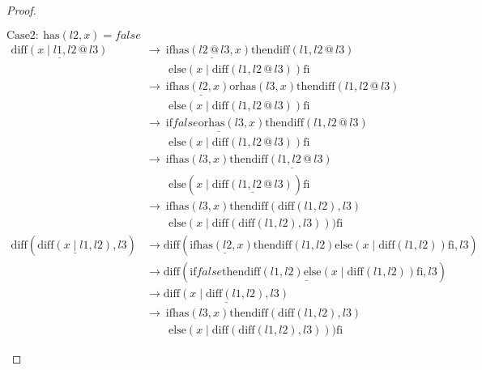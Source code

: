 \documentclass[12pt, a4paper]{article}
\newcommand{\rel}[1]{\mathrel{#1}}
\newcommand{\rmx}[1]{\mathrm{#1}}
\newcommand{\larrow}{\longrightarrow}
\newcommand{\under}{\underline}
\begin{document}
\begin{proof}
\begin{description}
$\rmx{Case 2:}\ \rmx{has}(l2, x) = false$
\begin{align*}
\under{\rmx{diff}(x \rel{|} l1, l2 \rel{@} l3)}
	&\larrow\ \rel{\rmx{if}} \under{\rmx{has}(l2 \rel{@} l3, x)} \rel{\rmx{then}} \rmx{diff}(l1,l2 \rel{@} l3) \\
	&\quad \quad \rel{\rmx{else}} (x \rel{|} \rmx{diff}(l1, l2 \rel{@} l3)) \rel{\rmx{fi}} \tag{by } \\
	&\larrow\ \rel{\rmx{if}} \under{\rmx{has}(l2, x)} \rel{\rmx{or}} \rmx{has}(l3, x) \rel{\rmx{then}} \rmx{diff}(l1,l2 \rel{@} l3) \\
	&\quad \quad \rel{\rmx{else}} (x \rel{|} \rmx{diff}(l1, l2 \rel{@} l3)) \rel{\rmx{fi}} \tag{by Lemma 1 from Problem 6} \\
	&\larrow\ \rel{\rmx{if}} \under{false \rel{\rmx{or}} \rmx{has}(l3, x)} \rel{\rmx{then}} \rmx{diff}(l1,l2 \rel{@} l3) \\
	&\quad \quad \rel{\rmx{else}} (x \rel{|} \rmx{diff}(l1, l2 \rel{@} l3)) \rel{\rmx{fi}} \tag{by case splitting} \\
	&\larrow\ \rel{\rmx{if}} \rmx{has}(l3, x) \rel{\rmx{then}} \under{\rmx{diff}(l1,l2 \rel{@} l3)} \\
	&\quad \quad \rel{\rmx{else}} (x \rel{|} \under{\rmx{diff}(l1, l2 \rel{@} l3)}) \rel{\rmx{fi}} \tag{by or} \\
	&\larrow\ \rel{\rmx{if}} \rmx{has}(l3, x) \rel{\rmx{then}} \rmx{diff}(\rmx{diff}(l1, l2), l3) \\
	&\quad \quad \rel{\rmx{else}} (x \rel{|} \rmx{diff}(\rmx{diff}(l1, l2), l3))) \rel{\rmx{fi}} \tag{by IH} \\
\rmx{diff}(\under{\rmx{diff}(x \rel{|} l1, l2)}, l3)
	&\larrow \rmx{diff}(\rel{\rmx{if}} \under{\rmx{has}(l2, x)} \rel{\rmx{then}} \rmx{diff}(l1, l2) \rel{\rmx{else}} (x \rel{|} \rmx{diff}(l1, l2)) \rel{\rmx{fi}}, l3) \tag{by diff2} \\
	&\larrow \rmx{diff}(\under{\rel{\rmx{if}} false \rel{\rmx{then}} \rmx{diff}(l1, l2) \rel{\rmx{else}} (x \rel{|} \rmx{diff}(l1, l2)) \rel{\rmx{fi}}}, l3) \tag{by case splitting} \\
	&\larrow \under{\rmx{diff}(x \rel{|} \rmx{diff}(l1, l2), l3)} \tag{by if2} \\
	&\larrow\ \rel{\rmx{if}} \rmx{has}(l3, x) \rel{\rmx{then}} \rmx{diff}(\rmx{diff}(l1, l2), l3) \\
	&\quad \quad \rel{\rmx{else}} (x \rel{|} \rmx{diff}(\rmx{diff}(l1, l2), l3))) \rel{\rmx{fi}} \tag{by diff2}
\end{align*}

\end{description}
\end{proof}
\end{document}
